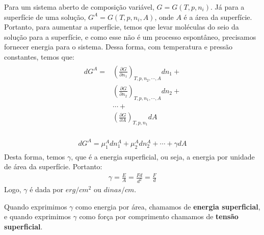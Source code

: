   \begin{definition}
    Para um sistema aberto de composição variável, $G = G(T,p,n_i)$. Já para a superfície de uma solução, $G^{A}=G(T,p,n_i,A)$, onde $A$ é a área da superfície. Portanto, para aumentar a superfície, temos que levar moléculas do seio da solução para a superfície, e como esse não é um processo espontâneo, precisamos fornecer energia para o sistema. Dessa forma, com temperatura e pressão constantes, temos que:
    \begin{gather}
      \begin{align}
        dG^{A} = & \left( \frac{\partial G}{\partial n_1}  \right)_{T,p,n_2, \cdots,A} dn_1 + \\
                 & \left( \frac{\partial G}{\partial n_2}  \right)_{T,p,n_1,\cdots,A} dn_2 +  \\
                 & \cdots +                                                                   \\
                 & \left( \frac{\partial G}{\partial A} \right)_{T,p,n_1} dA
      \end{align}
    \end{gather}

    \begin{gather}
      \begin{aligned}
        dG^{A} = \mu_1^{A} dn_1^{A} + \mu_2^{A} dn_2^{A} + \cdots + \gamma dA
      \end{aligned}
    \end{gather}
    Desta forma, temos $\gamma$, que é a energia superficial, ou seja, a energia por unidade de área da superfície. Portanto:
    \begin{gather}
      \gamma = \frac{E}{A} = \frac{F d}{d^2} = \frac{F}{d}
    \end{gather}
    Logo, $\gamma$ é dada por $erg/cm^2$ ou $dinas/cm$.
  \end{definition}
  \begin{remark}
    Quando exprimimos $\gamma$ como energia por área, chamamos de \textbf{energia superficial}, e quando exprimimos $\gamma$ como força por comprimento chamamos de \textbf{tensão superficial}.
  \end{remark}

